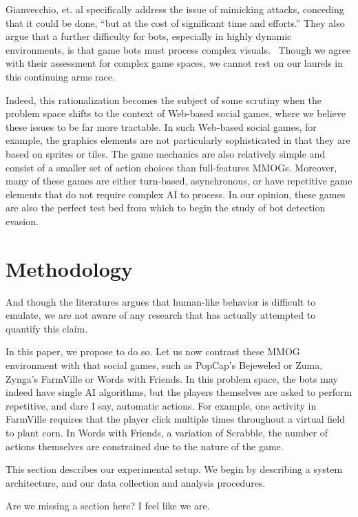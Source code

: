 \documentclass{acm_proc_article-sp}
\begin{document}
Gianvecchio, et. al specifically address the issue of mimicking attacks, conceding that it could be done, ``but at the cost of significant time and efforts.'' They also argue that a further difficulty for bots, especially in highly dynamic environments, is that game bots must process complex visuals.~\cite{botcraft} Though we agree with their assessment for complex game spaces, we cannot rest on our laurels in this continuing arms race.

Indeed, this rationalization becomes the subject of some scrutiny when the problem space shifts to the context of Web-based social games, where we believe these issues to be far more tractable. In such Web-based social games, for example, the graphics elements are not particularly sophisticated in that they are based on sprites or tiles. The game mechanics are also relatively simple and consist of a smaller set of action choices than full-features MMOGs. Moreover, many of these games are either turn-based, asynchronous, or have repetitive game elements that do not require complex AI to process. In our opinion, these games are also the perfect test bed from which to begin the study of bot detection evasion.

\section{Methodology}

And though the literatures argues that human-like behavior is difficult to emulate, we are not aware of any research that has actually attempted to quantify this claim.

In this paper, we propose to do so. Let us now contrast these MMOG environment with that social games, such as PopCap's Bejeweled or Zuma, Zynga's FarmVille or Words with Friends. In this problem space, the bots may indeed have single AI algorithms, but the players themselves are asked to perform repetitive, and dare I say, automatic actions. For example, one activity in FarmVille requires that the player click multiple times throughout a virtual field to plant corn. In Words with Friends, a variation of Scrabble, the number of actions themselves are constrained due to the nature of the game.

This section describes our experimental setup. We begin by describing a system architecture, and our data collection and analysis procedures.

Are we missing a section here? I feel like we are.
\end{document}
